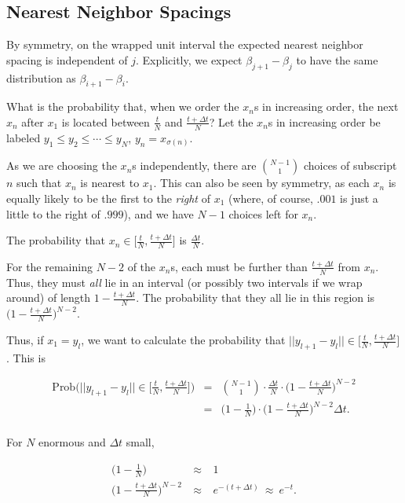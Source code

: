 \documentclass[12pt,letterpaper]{report}
\newcommand\bea{\begin{eqnarray}}
\newcommand\eea{\end{eqnarray}}
\newcommand{\ncr}[2]{{#1 \choose #2}}
\begin{document}
\subsection{Nearest Neighbor Spacings}

By symmetry, on the wrapped unit interval the expected nearest
neighbor spacing is independent of $j$. Explicitly, we expect
$\beta_{j+1} - \beta_j$ to have the same distribution as
$\beta_{i+1} - \beta_i$.

What is the probability that, when we order the $x_n$s in
increasing order, the next $x_n$ after $x_1$ is located between
$\frac{t}{N}$ and $\frac{t+\Delta t}{N}$? Let the $x_n$s in
increasing order be labeled $y_1 \le y_2 \le \cdots \le y_N$, $y_n
= x_{\sigma(n)}$.

As we are choosing the $x_n$s independently, there are
$\ncr{N-1}{1}$ choices of subscript $n$ such that $x_n$ is nearest
to $x_1$. This can also be seen by symmetry, as each $x_n$ is
equally likely to be the first to the \emph{right} of $x_1$
(where, of course, $.001$ is just a little to the right of
$.999$), and we have $N-1$ choices left for $x_n$.

The probability that $x_n \in \Big[\frac{t}{N}, \frac{t+\Delta
t}{N}\Big]$ is $\frac{\Delta t}{N}$.

For the remaining $N-2$ of the $x_n$s, each must be further than
$\frac{t+\Delta t}{N}$ from $x_n$. Thus, they must \emph{all} lie
in an interval (or possibly two intervals if we wrap around) of
length $1 - \frac{t+\Delta t}{N}$. The probability that they all
lie in this region is $\Big( 1 - \frac{t+\Delta t}{N}
\Big)^{N-2}$.

Thus, if $x_1 = y_l$, we want to calculate the probability that
$||y_{l+1} - y_l|| \in \Big[\frac{t}{N}, \frac{t+\Delta
t}{N}\Big]$. This is

\bea \text{Prob}\Bigg( ||y_{l+1} - y_l|| \in \Big[\frac{t}{N},
\frac{t+\Delta t}{N}\Big] \Bigg) &=& \ncr{N-1}{1} \cdot
\frac{\Delta t}{N} \cdot \Big( 1 - \frac{t+\Delta t}{N}
\Big)^{N-2} \nonumber\\ &=& \Big(1 - \frac{1}{N}\Big) \cdot \Big(
1 - \frac{t+\Delta t}{N} \Big)^{N-2} \Delta t. \nonumber\\ & &
\eea

For $N$ enormous and $\Delta t$ small,

\bea \Big(1 - \frac{1}{N}\Big) \ \ \ \ \ \ \ \ \ \ \ & \ \approx \ & 1 \nonumber\\
\Big( 1 - \frac{t+\Delta t}{N} \Big)^{N-2} & \ \approx \ &
e^{-(t+\Delta t)} \ \approx \ e^{-t}. \eea
\end{document}
